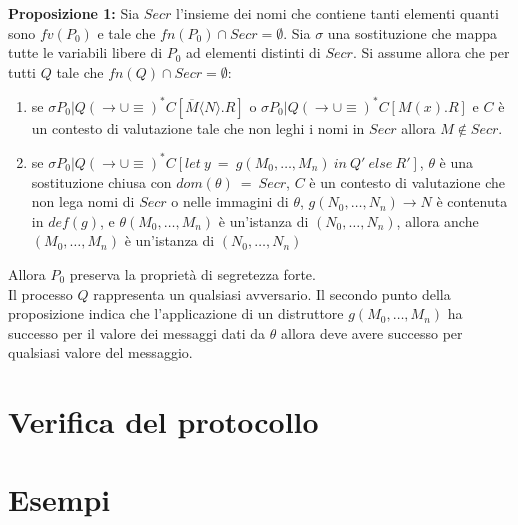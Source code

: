 \documentclass[12pt]{report}
\begin{document}
\textbf{Proposizione 1:} Sia $Secr$ l'insieme dei nomi che contiene tanti elementi quanti sono $fv(P_0)$  e tale che $fn(P_0) \cap Secr = \emptyset$. Sia $\sigma$ una sostituzione che mappa tutte le variabili libere di $P_0$ ad elementi distinti di $Secr$. Si assume allora che per tutti $Q$ tale che $fn(Q) \cap Secr = \emptyset$:
\begin{enumerate}
    \item se $\sigma P_0 | Q (\rightarrow \cup \equiv)^* C[\overline{M} \langle N \rangle . R]$ o $\sigma P_0 | Q (\rightarrow \cup \equiv)^* C[M(x).R]$ e $C$ è un contesto di valutazione tale che non leghi i nomi in $Secr$ allora $M \notin Secr$.
    
    \item se $\sigma P_0 | Q (\rightarrow \cup \equiv)^* C[let\ y\ =\ g(M_0,\dots,M_n)\ in\ Q'\ else\ R']$, $\theta$ è una sostituzione chiusa con $dom(\theta)\ =\ Secr$, $C$ è un contesto di valutazione che non lega nomi di $Secr$ o nelle immagini di $\theta$, $g(N_0,\dots,N_n) \rightarrow N$ è contenuta in $def(g)$, e $\theta (M_0,\dots,M_n)$ è un'istanza di $(N_0,\dots,N_n)$, allora anche $(M_0,\dots,M_n)$ è un'istanza di $(N_0,\dots,N_n)$   
\end{enumerate}
Allora $P_0$ preserva la proprietà di segretezza forte.\\

Il processo $Q$ rappresenta un qualsiasi avversario. Il secondo punto della proposizione indica che l'applicazione di un distruttore $g(M_0,\dots,M_n)$ ha successo per il valore dei messaggi dati da $\theta$ allora deve avere successo per qualsiasi valore del messaggio. 

\section*{Verifica del protocollo}
\section*{Esempi}
\end{document}
